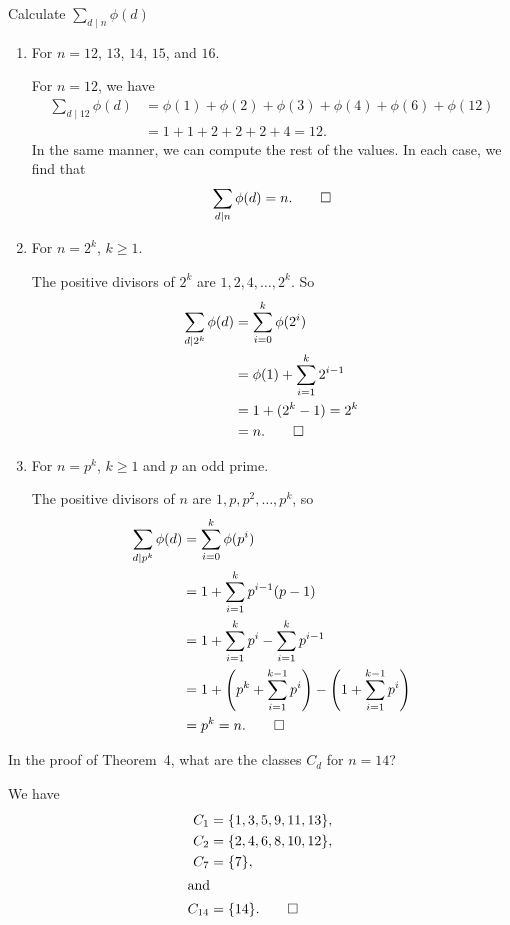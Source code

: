  Calculate $\displaystyle\sum_{d\mid n}\phi(d)$
\begin{enumerate}
\item For $n = 12$, $13$, $14$, $15$, and $16$.
  \begin{solution}
    For $n = 12$, we have
    \begin{align*}
      \sum_{d\mid12}\phi(d)
      &= \phi(1) + \phi(2) + \phi(3) + \phi(4) + \phi(6) + \phi(12) \\
      &= 1 + 1 + 2 + 2 + 2 + 4 = 12.
    \end{align*}
    In the same manner, we can compute the rest of the values. In each
    case, we find that
    \begin{equation*}
      \sum_{d\mid n}\phi(d) = n. \qedhere
    \end{equation*}
  \end{solution}
\item For $n = 2^k$, $k\geq1$.
  \begin{solution}
    The positive divisors of $2^k$ are $1,2,4,\dots,2^k$. So
    \begin{align*}
      \sum_{d\mid2^k}\phi(d)
      &= \sum_{i=0}^k\phi(2^i) \\
      &= \phi(1) + \sum_{i=1}^k2^{i-1} \\
      &= 1 + (2^k - 1)
        = 2^k \\
      &= n. \qedhere
    \end{align*}
  \end{solution}
\item For $n = p^k$, $k\geq1$ and $p$ an odd prime.
  \begin{solution}
    The positive divisors of $n$ are $1, p, p^2, \dots, p^k$, so
    \begin{align*}
      \sum_{d\mid p^k}\phi(d)
      &= \sum_{i=0}^k\phi(p^i) \\
      &= 1 + \sum_{i=1}^kp^{i-1}(p - 1) \\
      &= 1 + \sum_{i=1}^kp^i - \sum_{i=1}^kp^{i-1} \\
      &= 1 + \left(p^k + \sum_{i=1}^{k-1}p^i\right)
        - \left(1 + \sum_{i=1}^{k-1}p^i\right) \\
      &= p^k = n. \qedhere
    \end{align*}
  \end{solution}
\end{enumerate}

 In the proof of Theorem~4, what are the classes $C_d$
for $n = 14$?
\begin{solution}
  We have
  \begin{align*}
    C_1 &= \{1,3,5,9,11,13\}, \\
    C_2 &= \{2,4,6,8,10,12\}, \\
    C_7 &= \{7\}, \\
    \intertext{and}
    C_{14} &= \{14\}. \qedhere
  \end{align*}
\end{solution}

